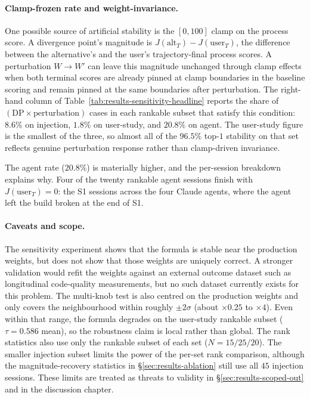 \paragraph{Clamp-frozen rate and weight-invariance.}
One possible source of artificial stability is the $[0, 100]$ clamp on the process score. A divergence point's magnitude is $J(\text{alt}_T) - J(\text{user}_T)$, the difference between the alternative's and the user's trajectory-final process scores. A perturbation $W \to W'$ can leave this magnitude unchanged through clamp effects when both terminal scores are already pinned at clamp boundaries in the baseline scoring and remain pinned at the same boundaries after perturbation. The right-hand column of Table~\ref{tab:results-sensitivity-headline} reports the share of $(\text{DP} \times \text{perturbation})$ cases in each rankable subset that satisfy this condition: $8.6\%$ on injection, $\mathbf{1.8\%}$ on user-study, and $20.8\%$ on agent. The user-study figure is the smallest of the three, so almost all of the $96.5\%$ top-$1$ stability on that set reflects genuine perturbation response rather than clamp-driven invariance.

The agent rate ($20.8\%$) is materially higher, and the per-session breakdown explains why. Four of the twenty rankable agent sessions finish with $J(\text{user}_T) = 0$: the S1 sessions across the four Claude agents, where the agent left the build broken at the end of S1.

\paragraph{Caveats and scope.}
The sensitivity experiment shows that the formula is stable near the production weights, but does not show that those weights are uniquely correct. A stronger validation would refit the weights against an external outcome dataset such as longitudinal code-quality measurements, but no such dataset currently exists for this problem. The multi-knob test is also centred on the production weights and only covers the neighbourhood within roughly $\pm 2\sigma$ (about $\times 0.25$ to $\times 4$). Even within that range, the formula degrades on the user-study rankable subset ($\tau = 0.586$ mean), so the robustness claim is local rather than global. The rank statistics also use only the rankable subset of each set ($N = 15 / 25 / 20$). The smaller injection subset limits the power of the per-set rank comparison, although the magnitude-recovery statistics in \S\ref{sec:results-ablation} still use all $45$ injection sessions. These limits are treated as threats to validity in \S\ref{sec:results-scoped-out} and in the discussion chapter.

